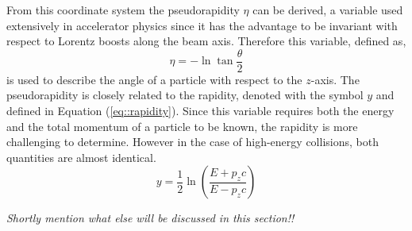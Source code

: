 From this coordinate system the pseudorapidity $\eta$ can be derived, a variable used extensively in accelerator physics since it has the advantage to be invariant with respect to Lorentz boosts along the beam axis. Therefore this variable, defined as,
\begin{equation} \label{eq::PseudoRapidity}
 \eta = - \ln \tan \frac{\theta}{2}
\end{equation}
is used to describe the angle of a particle with respect to the $z$-axis. The pseudorapidity is closely related to the rapidity, denoted with the symbol $y$ and defined in Equation (\ref{eq::rapidity}). Since this variable requires both the energy and the total momentum of a particle to be known, the rapidity is more challenging to determine. However in the case of high-energy collisions, both quantities are almost identical.
\begin{equation}\label{eq::rapidity}
 y = \frac{1}{2} \ln \left( \frac{E+p_{z}c}{E - p_{z}c} \right)
\end{equation}

\textit{Shortly mention what else will be discussed in this section!!}

